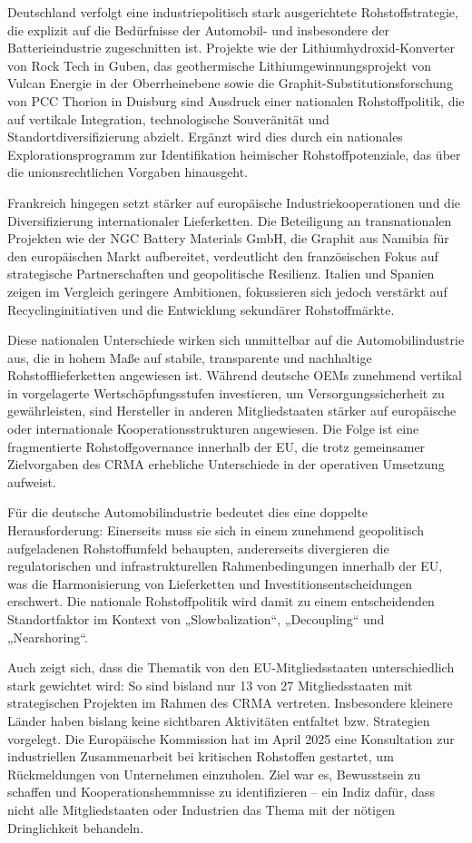 \documentclass[12pt,a4paper,oneside]{book} %
\begin{document}
Deutschland verfolgt eine industriepolitisch stark ausgerichtete Rohstoffstrategie, die explizit auf die Bedürfnisse der Automobil- und insbesondere der Batterieindustrie zugeschnitten ist. Projekte wie der Lithiumhydroxid-Konverter von Rock Tech in Guben, das geothermische Lithiumgewinnungsprojekt von Vulcan Energie in der Oberrheinebene sowie die Graphit-Substitutionsforschung von PCC Thorion in Duisburg sind Ausdruck einer nationalen Rohstoffpolitik, die auf vertikale Integration, technologische Souveränität und Standortdiversifizierung abzielt. Ergänzt wird dies durch ein nationales Explorationsprogramm zur Identifikation heimischer Rohstoffpotenziale, das über die unionsrechtlichen Vorgaben hinausgeht.

Frankreich hingegen setzt stärker auf europäische Industriekooperationen und die Diversifizierung internationaler Lieferketten. Die Beteiligung an transnationalen Projekten wie der NGC Battery Materials GmbH, die Graphit aus Namibia für den europäischen Markt aufbereitet, verdeutlicht den französischen Fokus auf strategische Partnerschaften und geopolitische Resilienz. Italien und Spanien zeigen im Vergleich geringere Ambitionen, fokussieren sich jedoch verstärkt auf Recyclinginitiativen und die Entwicklung sekundärer Rohstoffmärkte.

Diese nationalen Unterschiede wirken sich unmittelbar auf die Automobilindustrie aus, die in hohem Maße auf stabile, transparente und nachhaltige Rohstofflieferketten angewiesen ist. Während deutsche OEMs zunehmend vertikal in vorgelagerte Wertschöpfungsstufen investieren, um Versorgungssicherheit zu gewährleisten, sind Hersteller in anderen Mitgliedstaaten stärker auf europäische oder internationale Kooperationsstrukturen angewiesen. Die Folge ist eine fragmentierte Rohstoffgovernance innerhalb der EU, die trotz gemeinsamer Zielvorgaben des CRMA erhebliche Unterschiede in der operativen Umsetzung aufweist.

Für die deutsche Automobilindustrie bedeutet dies eine doppelte Herausforderung: Einerseits muss sie sich in einem zunehmend geopolitisch aufgeladenen Rohstoffumfeld behaupten, andererseits divergieren die regulatorischen und infrastrukturellen Rahmenbedingungen innerhalb der EU, was die Harmonisierung von Lieferketten und Investitionsentscheidungen erschwert. Die nationale Rohstoffpolitik wird damit zu einem entscheidenden Standortfaktor im Kontext von „Slowbalization“, „Decoupling“ und „Nearshoring“.

Auch zeigt sich, dass die Thematik von den EU-Mitgliedsstaaten unterschiedlich stark gewichtet wird: So sind bisland nur 13 von 27 Mitgliedsstaaten mit strategischen Projekten im Rahmen des CRMA vertreten. Insbesondere kleinere Länder haben bislang keine sichtbaren Aktivitäten entfaltet bzw. Strategien vorgelegt. Die Europäische Kommission hat im April 2025 eine Konsultation zur industriellen Zusammenarbeit bei kritischen Rohstoffen gestartet, um Rückmeldungen von Unternehmen einzuholen. Ziel war es, Bewusstsein zu schaffen und Kooperationshemmnisse zu identifizieren – ein Indiz dafür, dass nicht alle Mitgliedstaaten oder Industrien das Thema mit der nötigen Dringlichkeit behandeln.
\end{document}
